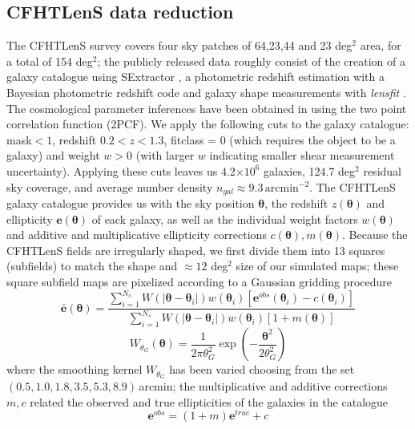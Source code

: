 \documentclass[reprint,aps,prd,superscriptaddress,showkeys,showpacs]{revtex4-1}
\begin{document}
\subsection{CFHTLenS data reduction}
\label{cfhtdatareduction}
%
The CFHTLenS survey covers four sky patches of 64,23,44 and 23 deg$^2$ area, for a total of 154 deg$^2$; the publicly released data roughly consist of the creation of a galaxy catalogue using SExtractor \citep{SExtractor}, a photometric redshift estimation with a Bayesian photometric redshift code \citep{PhotoCode} and galaxy shape measurements with \textit{lensfit} \citep{cfht1,cfht2}. The cosmological parameter inferences have been obtained in \citep{CFHTKilbinger} using the two point correlation function (2PCF). We apply the following cuts to the galaxy catalogue: mask$<1$, redshift $0.2 < z < 1.3$, fitclass = 0 (which requires the object to be a galaxy) and weight $w>0$ (with larger $w$ indicating smaller shear measurement uncertainty). Applying these cuts leaves us 4.2$\times10^6$ galaxies, 124.7 deg$^2$ residual sky coverage, and average number density $n_{gal} \approx 9.3\,\mathrm{arcmin}^{-2}$. The CFHTLenS galaxy catalogue provides us with the sky position $\pmb{\theta}$, the redshift $z(\pmb{\theta})$ and ellipticity $\mathbf{e}(\pmb{\theta})$ of eack galaxy, as well as the individual weight factors $w(\pmb{\theta})$ and additive and multiplicative ellipticity corrections $c(\pmb{\theta}),m(\pmb{\theta})$. Because the CFHTLenS fields are irregularly shaped, we first divide them into 13 squares (subfields) to match the shape and $\approx12$ deg$^2$ size of our simulated maps; these square subfield maps are pixelized according to a Gaussian gridding procedure
\begin{equation}
\bar{\mathbf{e}}(\pmb{\theta}) = \frac{\sum_{i=1}^{N_s} W(\vert\pmb{\theta}-\pmb{\theta}_i\vert)w(\pmb{\theta}_i)[\mathbf{e}^{obs}(\pmb{\theta}_i)-c(\pmb{\theta}_i)]}{\sum_{i=1}^{N_s}W(\vert\pmb{\theta}-\pmb{\theta}_i\vert)w(\pmb{\theta}_i)[1+m(\pmb{\theta})]}
\end{equation} 
\begin{equation}
\label{gausskernel}
W_{\theta_G}(\pmb{\theta}) = \frac{1}{2\pi\theta_G^2}\exp{\left(-\frac{\pmb{\theta}^2}{2\theta_G^2}\right)}
\end{equation}
%
where the smoothing kernel $W_{\theta_G}$ has been varied choosing from the set $(0.5,1.0,1.8,3.5,5.3,8.9)\,$arcmin; the multiplicative and additive corrections $m,c$ related the observed and true ellipticities of the galaxies in the catalogue
\begin{equation}
\mathbf{e}^{obs} = (1+m)\mathbf{e}^{true} + c
\end{equation}
\end{document}

